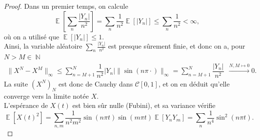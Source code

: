 \documentclass{article}
\theoremstyle{definition}
\numberwithin{equation}{section}
\DeclareMathOperator{\N}{\mathbb{N}}
\DeclareMathOperator{\E}{\mathbb{E}}
\begin{document}
\begin{proof}
Dans un premier temps, on calcule 
$$ \E\left[\sum_n \dfrac{|Y_n|}{n^2}\right]=\sum_n\dfrac{1}{n^2}\E[|Y_n|]\leq\sum_n\dfrac{1}{n^2}<\infty, $$
où on a utilisé que $\E[|Y_n|]\leq 1$.\\
Ainsi, la variable aléatoire $\sum_n\frac{|Y_n|}{n^2}$ est presque sûrement finie, et donc on a, pour $N>M\in\N$ 
\begin{align*}
    \|X^N-X^M\|_\infty \leq \sum_{n=M+1}^N \dfrac{1}{n^2}|Y_n|\|\sin(n\pi\cdot)\|_\infty = \sum_{n=M+1}^N \dfrac{|Y_n|}{n^2} ~~ \overset{N,M\mapsto 0}{\longrightarrow} 0.
\end{align*}
La suite $(X^N)_N$ est donc de Cauchy dans $\mathcal{C}[0,1]$, et on en déduit qu'elle converge vers la limite notée $X$.\\
L'espérance de $X(t)$ est bien sûr nulle (Fubini), et sa variance vérifie
$$ \E[X(t)^2] = \sum_{n,m}\dfrac{1}{n^2m^2}\sin(n\pi t)\sin(m\pi t)\E[Y_nY_m]=\sum_n \dfrac{1}{n^4}\sin^2(n\pi t).$$
\end{proof}
\end{document}

